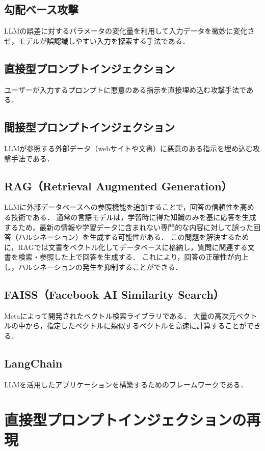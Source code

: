 \documentclass[dvipdfmx,a4paper,11pt]{jsarticle}
\begin{document}
\subsection{勾配ベース攻撃}
LLMの誤差に対するパラメータの変化量を利用して入力データを微妙に変化させ，モデルが誤認識しやすい入力を探索する手法である．
\endgroup

\subsection{直接型プロンプトインジェクション}
ユーザーが入力するプロンプトに悪意のある指示を直接埋め込む攻撃手法である．

\subsection{間接型プロンプトインジェクション}
LLMが参照する外部データ（webサイトや文書）に悪意のある指示を埋め込む攻撃手法である．

\subsection{RAG（Retrieval Augmented Generation）}
LLMに外部データベースへの参照機能を追加することで，回答の信頼性を高める技術である．
通常の言語モデルは，学習時に得た知識のみを基に応答を生成するため，最新の情報や学習データに含まれない専門的な内容に対して誤った回答（ハルシネーション）を生成する可能性がある．
この問題を解決するために，RAGでは文書をベクトル化してデータベースに格納し，質問に関連する文書を検索・参照した上で回答を生成する．
これにより，回答の正確性が向上し，ハルシネーションの発生を抑制することができる．

\subsection{FAISS（Facebook AI Similarity Search）}
Metaによって開発されたベクトル検索ライブラリである．
大量の高次元ベクトルの中から，指定したベクトルに類似するベクトルを高速に計算することができる．

\subsection{LangChain}
LLMを活用したアプリケーションを構築するためのフレームワークである．


\section{直接型プロンプトインジェクションの再現}
\end{document}
